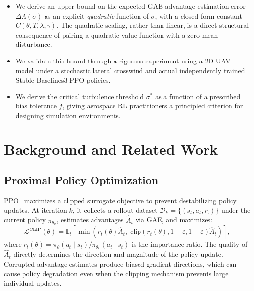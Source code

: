 \documentclass[10pt, conference]{IEEEtran}
\begin{document}
\begin{itemize}
  \item We derive an upper bound on the expected GAE advantage estimation
        error $\Delta A(\sigma)$ as an explicit \emph{quadratic} function
        of $\sigma$, with a closed-form constant $C(\theta, T, \lambda,
        \gamma)$. The quadratic scaling, rather than linear, is a direct
        structural consequence of pairing a quadratic value function with
        a zero-mean disturbance.

  \item We validate this bound through a rigorous experiment
        using a 2D UAV model under a stochastic lateral crosswind and 
        actual independently trained Stable-Baselines3 PPO policies.

  \item We derive the critical turbulence threshold $\sigma^{*}$ as a
        function of a prescribed bias tolerance $f$, giving aerospace RL
        practitioners a principled criterion for designing simulation
        environments.
\end{itemize}

\section{Background and Related Work}

\subsection{Proximal Policy Optimization}

PPO~\cite{schulman2017} maximizes a clipped surrogate objective to
prevent destabilizing policy updates. At iteration $k$, it collects a
rollout dataset $\mathcal{D}_k = \{(s_t, a_t, r_t)\}$ under the current
policy $\pi_{\theta_k}$, estimates advantages $\hat{A}_t$ via GAE, and
maximizes:
\begin{equation}
  \mathcal{L}^{\text{CLIP}}(\theta) =
  \mathbb{E}_t\!\left[\min\!\left(r_t(\theta)\hat{A}_t,\;
  \mathrm{clip}(r_t(\theta), 1-\varepsilon, 1+\varepsilon)\hat{A}_t
  \right)\right],
\end{equation}
where $r_t(\theta) = \pi_\theta(a_t\mid s_t)/\pi_{\theta_k}(a_t\mid s_t)$
is the importance ratio. The quality of $\hat{A}_t$ directly determines
the direction and magnitude of the policy update. Corrupted advantage
estimates produce biased gradient directions, which can cause policy
degradation even when the clipping mechanism prevents large individual
updates.
\end{document}
